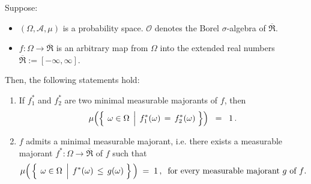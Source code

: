 \begin{theorem}
\mbox{}\vskip 0.1cm
\noindent
Suppose:
\begin{itemize}
\item
	$(\Omega,\mathcal{A},\mu)$ is a probability space.
	$\mathcal{O}$ denotes the Borel $\sigma$-algebra of $\overline{\Re}$.
\item
	$f : \Omega \longrightarrow \overline{\Re}$
	is an arbitrary map from $\Omega$ into the extended real numbers
	$\overline{\Re} := [-\infty,\infty]$.
\end{itemize}
Then, the following statements hold:
\begin{enumerate}
\item
	If $f^{*}_{1}$ and $f^{*}_{2}$ are two minimal measurable majorants of $f$, then
	\begin{equation*}
	\mu\!\left(\left\{\;
		\left.
		\omega \overset{{\color{white}.}}{\in} \Omega
		\;\,\right\vert\;
		f^{*}_{1}(\omega) \, = \, f^{*}_{2}(\omega) 
		\;\right\}\right)
	\;\; = \;\; 1\,.
	\end{equation*}
\item
	$f$ admits a minimal measurable majorant,
	i.e. there exists a measurable majorant $f^{*} : \Omega \longrightarrow \overline{\Re}$ of $f$ such that
	\begin{equation*}
	\mu\!\left(\,\left\{\;\left.\omega\overset{{\color{white}.}}{\in}\Omega\;\,\right\vert\; f^{*}(\omega) \,\leq\, g(\omega)\;\right\}\,\right)
	\;=\;1\,,\;\;
	\textnormal{for every measurable majorant $g$ of $f$}.
	\end{equation*}
\end{enumerate}
\end{theorem}
\proof
